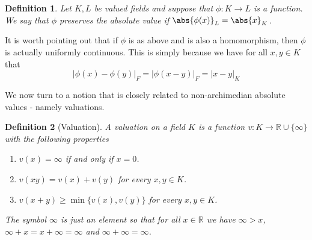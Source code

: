 \documentclass{article}
\newtheorem{definition}{Definition}[section]
\newtheorem{proposition}{Proposition}[section]
\newcommand{\mbb}[1]{\mathbb{#1}}
\begin{document}
\begin{definition}
    Let $K, L$ be valued fields and suppose that $\phi : K \to L$ is a function. We say that $\phi$ preserves the absolute value if $\abs{\phi(x)}_L = \abs{x}_K$.
\end{definition}

It is worth pointing out that if $\phi$ is as above and is also a homomorphism, then $\phi$ is actually uniformly continuous. This is simply because we have for all $x,y \in K$ that
$$|\phi(x) - \phi(y)|_F = |\phi(x-y)|_F = |x-y|_K$$ 





We now turn to a notion that is closely related to non-archimedian absolute values - namely valuations. 

\begin{definition}[Valuation]\label{def: Valuation} 
    A valuation on a field $K$ is a function $v : K \to \mbb R \cup \{\infty\}$ with the following properties 
    \begin{enumerate}
        \item $v(x) = \infty$ if and only if $x = 0$.
        \item $v(xy) = v(x) + v(y)$ for every $x,y \in K$. 
        \item $v(x + y) \geq \min \{v(x), v(y)\}$ for every $x,y \in K$.
    \end{enumerate}
    The symbol $\infty$ is just an element so that for all $x \in \mbb R$ we have $\infty > x$,  $\infty + x = x + \infty = \infty$ and $\infty + \infty = \infty$. 
\end{definition}
\end{document}
